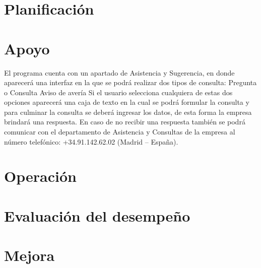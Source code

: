 \documentclass[12pt,a4paper]{article}
\begin{document}
\section{Planificación}\textbf{}
\section{Apoyo}\textbf{}
El programa cuenta con un apartado de Asistencia y Sugerencia, en donde aparecerá una interfaz en la que se podrá realizar dos tipos de consulta:
Pregunta o Consulta
Aviso de avería
Si el usuario selecciona cualquiera de estas dos opciones aparecerá una caja de texto en la cual se podrá formular la consulta y para culminar la consulta se deberá ingresar los datos, de esta forma la empresa brindará una respuesta.
En caso de no recibir una respuesta también se podrá comunicar con el departamento de Asistencia y Consultas de la empresa al número telefónico:   +34.91.142.62.02 (Madrid – España).

\section{Operación}\textbf{}
\section{Evaluación del desempeño}\textbf{}
\section{Mejora}\textbf{}
\end{document}
